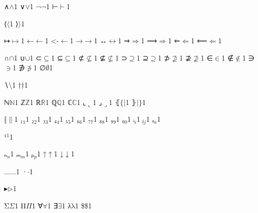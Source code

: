 {{∧}{{\ensuremath{\wedge}}}1
{∨}{{\ensuremath{\vee}}}1
{¬}{{\ensuremath{\neg}}}1
{⊢}{{\ensuremath{\vdash}}}1

{⟨}{{\ensuremath{\langle}}}1
{⟩}{{\ensuremath{\rangle}}}1

{↦}{{\ensuremath{\mapsto}}}1
{←}{{\ensuremath{\leftarrow}}}1
{<-}{{\ensuremath{\leftarrow}}}1
{→}{{\ensuremath{\rightarrow}}}1
{↔}{{\ensuremath{\leftrightarrow}}}1
{⇒}{{\ensuremath{\Rightarrow}}}1
{⟹}{{\ensuremath{\Longrightarrow}}}1
{⇐}{{\ensuremath{\Leftarrow}}}1
{⟸}{{\ensuremath{\Longleftarrow}}}1

{∩}{{\ensuremath{\cap}}}1
{∪}{{\ensuremath{\cup}}}1
{⊂}{{\ensuremath{\subseteq}}}1
{⊆}{{\ensuremath{\subseteq}}}1
{⊄}{{\ensuremath{\nsubseteq}}}1
{⊈}{{\ensuremath{\nsubseteq}}}1
{⊃}{{\ensuremath{\supseteq}}}1
{⊇}{{\ensuremath{\supseteq}}}1
{⊅}{{\ensuremath{\nsupseteq}}}1
{⊉}{{\ensuremath{\nsupseteq}}}1
{∈}{{\ensuremath{\in}}}1
{∉}{{\ensuremath{\notin}}}1
{∋}{{\ensuremath{\ni}}}1
{∌}{{\ensuremath{\notni}}}1
{∅}{{\ensuremath{\emptyset}}}1

{∖}{{\ensuremath{\setminus}}}1
{†}{{\ensuremath{\dag}}}1

{ℕ}{{\ensuremath{\mathbb{N}}}}1
{ℤ}{{\ensuremath{\mathbb{Z}}}}1
{ℝ}{{\ensuremath{\mathbb{R}}}}1
{ℚ}{{\ensuremath{\mathbb{Q}}}}1
{ℂ}{{\ensuremath{\mathbb{C}}}}1
{⌞}{{\ensuremath{\llcorner}}}1
{⌟}{{\ensuremath{\lrcorner}}}1
{⦃}{{\ensuremath{\{\!|}}}1
{⦄}{{\ensuremath{|\!\}}}}1

{‖}{{\ensuremath{\|}}}1
{₁}{{\ensuremath{_1}}}1
{₂}{{\ensuremath{_2}}}1
{₃}{{\ensuremath{_3}}}1
{₄}{{\ensuremath{_4}}}1
{₅}{{\ensuremath{_5}}}1
{₆}{{\ensuremath{_6}}}1
{₇}{{\ensuremath{_7}}}1
{₈}{{\ensuremath{_8}}}1
{₉}{{\ensuremath{_9}}}1
{₀}{{\ensuremath{_0}}}1
{ᵢ}{{\ensuremath{_i}}}1
{ⱼ}{{\ensuremath{_j}}}1
{ₐ}{{\ensuremath{_a}}}1

{¹}{{\ensuremath{^1}}}1

{ₙ}{{\ensuremath{_n}}}1
{ₘ}{{\ensuremath{_m}}}1
{ₚ}{{\ensuremath{_p}}}1
{↑}{{\ensuremath{\uparrow}}}1
{↓}{{\ensuremath{\downarrow}}}1

{...}{{\ensuremath{\ldots}}}1
{·}{{\ensuremath{\cdot}}}1

{▸}{{\ensuremath{\triangleright}}}1

{Σ}{{\color{symbolcolor}\ensuremath{\Sigma}}}1
{Π}{{\color{symbolcolor}\ensuremath{\Pi}}}1
{∀}{{\color{symbolcolor}\ensuremath{\forall}}}1
{∃}{{\color{symbolcolor}\ensuremath{\exists}}}1
{λ}{{\color{symbolcolor}\ensuremath{\mathrm{\lambda}}}}1
{\$}{{\color{symbolcolor}\$}}1

}
